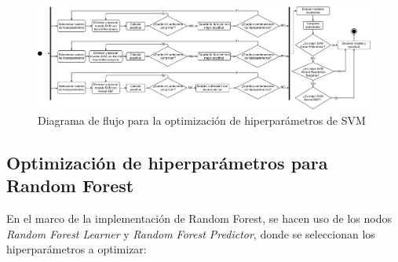 \begin{figure}[H]
	\centering
	\includegraphics[width=1\linewidth]{"figuras/capi 2/hpo/Optimizacion SVM"}
	\caption{Diagrama de flujo para la optimización de hiperparámetros de SVM}
	\label{fig:optimizacion-svm}
\end{figure}


\subsection{Optimización de hiperparámetros para Random Forest}
En el marco de la implementación de Random Forest, se hacen uso de los nodos \textit{Random Forest Learner} y \textit{Random Forest Predictor}, donde se seleccionan los hiperparámetros a optimizar:

